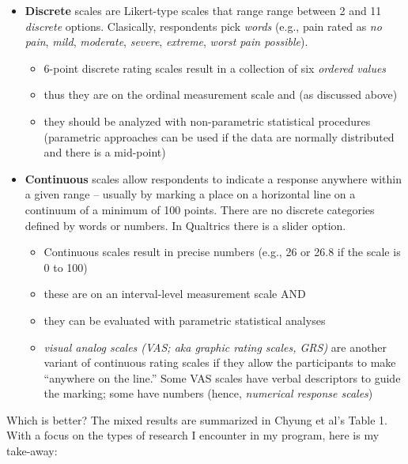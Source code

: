 \documentclass[
  english,
]{book}
\providecommand{\tightlist}{%
  \setlength{\itemsep}{0pt}\setlength{\parskip}{0pt}}
\begin{document}
\begin{itemize}
\tightlist
\item
  \textbf{Discrete} scales are Likert-type scales that range range between 2 and 11 \emph{discrete} options. Clasically, respondents pick \emph{words} (e.g., pain rated as \emph{no pain}, \emph{mild}, \emph{moderate}, \emph{severe}, \emph{extreme}, \emph{worst pain possible}).

  \begin{itemize}
  \tightlist
  \item
    6-point discrete rating scales result in a collection of six \emph{ordered values}
  \item
    thus they are on the ordinal measurement scale and (as discussed above)
  \item
    they should be analyzed with non-parametric statistical procedures (parametric approaches can be used if the data are normally distributed and there is a mid-point)
  \end{itemize}
\item
  \textbf{Continuous} scales allow respondents to indicate a response anywhere within a given range -- usually by marking a place on a horizontal line on a continuum of a minimum of 100 points. There are no discrete categories defined by words or numbers. In Qualtrics there is a slider option.

  \begin{itemize}
  \tightlist
  \item
    Continuous scales result in precise numbers (e.g., 26 or 26.8 if the scale is 0 to 100)
  \item
    these are on an interval-level measurement scale AND
  \item
    they can be evaluated with parametric statistical analyses
  \item
    \emph{visual analog scales (VAS; aka graphic rating scales, GRS)} are another variant of continuous rating scales if they allow the participants to make ``anywhere on the line.'' Some VAS scales have verbal descriptors to guide the marking; some have numbers (hence, \emph{numerical response scales})
  \end{itemize}
\end{itemize}

Which is better? The mixed results are summarized in Chyung et al's \citeyearpar{chyung_evidencebased_2018-1} Table 1. With a focus on the types of research I encounter in my program, here is my take-away:
\end{document}
